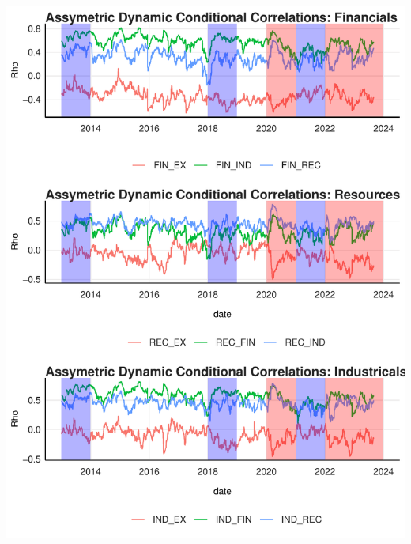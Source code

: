 \documentclass[12pt,preprint, authoryear]{elsarticle}
\let\origfigure\figure
\let\endorigfigure\endfigure
\renewenvironment{figure}[1][2] {
    \expandafter\origfigure\expandafter[H]
} {
    \endorigfigure
}
\numberwithin{equation}{section}
\numberwithin{figure}{section}
\numberwithin{table}{section}
\begin{document}
\begin{figure}[H]

{\centering \includegraphics{WriteUp_files/figure-latex/Figure3-1} 

}

\caption{aDCC  \label{Figure3}}\label{fig:Figure3}
\end{figure}
\end{document}
